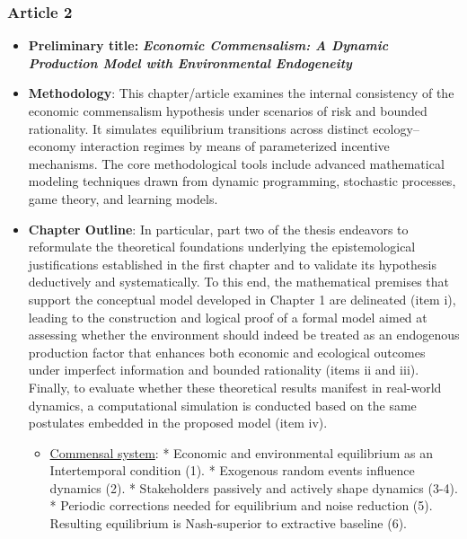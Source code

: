 \subsubsection{Article 2}

\begin{itemize}

    \item \textbf{Preliminary title:} \emph{\textbf{Economic Commensalism: A Dynamic Production Model with Environmental Endogeneity}}
    
    \item \textbf{Methodology}: This chapter/article examines the internal consistency of the economic commensalism hypothesis under scenarios of risk and bounded rationality. It simulates equilibrium transitions across distinct ecology–economy interaction regimes by means of parameterized incentive mechanisms. The core methodological tools include advanced mathematical modeling techniques drawn from dynamic programming, stochastic processes, game theory, and learning models.
    
    \item \textbf{Chapter Outline}: In particular, part two of the thesis endeavors to reformulate the theoretical foundations underlying the epistemological justifications established in the first chapter and to validate its hypothesis deductively and systematically. To this end, the mathematical premises that support the conceptual model developed in Chapter 1 are delineated (item i), leading to the construction and logical proof of a formal model aimed at assessing whether the environment should indeed be treated as an endogenous production factor that enhances both economic and ecological outcomes under imperfect information and bounded rationality (items ii and iii). Finally, to evaluate whether these theoretical results manifest in real-world dynamics, a computational simulation is conducted based on the same postulates embedded in the proposed model (item iv).
    
    \begin{itemize}
    
    \item[i.] \underline{Commensal system}: * Economic and environmental equilibrium as an Intertemporal condition (1). * Exogenous random events influence dynamics (2). * Stakeholders passively and actively shape dynamics (3-4). * Periodic corrections needed for equilibrium and noise reduction (5). Resulting equilibrium is Nash-superior to extractive baseline (6).
    

\end{itemize}
\end{itemize}
